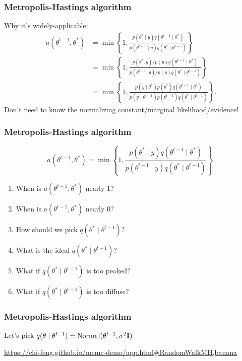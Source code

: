 \documentclass{beamer}
\begin{document}
\begin{frame}
\frametitle{Metropolis-Hastings algorithm}

Why it's widely-applicable:
\begin{align*}
a(\theta^{t-1}, \theta^*) &= \min\left\{1, \frac{p(\theta^* \mid y)q(\theta^{t-1} \mid \theta^*) }{p(\theta^{t-1} \mid y) q(\theta^* \mid \theta^{t-1}) }\right\} \\
&= \min\left\{1, \frac{p(\theta^*, y)/p(y)q(\theta^{t-1} \mid \theta^*) }{p(\theta^{t-1}, y)/p(y) q(\theta^* \mid \theta^{t-1}) }\right\} \\
&= \min\left\{1, \frac{p(y \mid \theta^*) p(\theta^*)q(\theta^{t-1} \mid \theta^*) }{p(y \mid \theta^{t-1}) p(\theta^{t-1}) q(\theta^* \mid \theta^{t-1}) }\right\}.
\end{align*}
Don't need to know the normalizing constant/marginal likelihood/evidence!

\end{frame}
\begin{frame}
\frametitle{Metropolis-Hastings algorithm}

$$
a(\theta^{t-1}, \theta^*) = \min\left\{1, \frac{p(\theta^* \mid y)q(\theta^{t-1} \mid \theta^*) }{p(\theta^{t-1} \mid y) q(\theta^* \mid \theta^{t-1}) }\right\}.
$$

\begin{enumerate}
\item When is $a(\theta^{t-1}, \theta^*)$ nearly $1$?
\item When is $a(\theta^{t-1}, \theta^*)$ nearly $0$?
\item How should we pick $q(\theta^* \mid \theta^{t-1})$?
\item What is the ideal $q(\theta^* \mid \theta^{t-1})$?
\item What if $q(\theta^* \mid \theta^{t-1})$ is too peaked?
\item What if $q(\theta^* \mid \theta^{t-1})$ is too diffuse?
\end{enumerate}


\end{frame}
\begin{frame}
\frametitle{Metropolis-Hastings algorithm}

Let's pick $q(\theta \mid \theta^{t-1}) = \text{Normal}(\theta^{t-1}, \sigma^2 {\bf I} )$
\newline

\url{https://chi-feng.github.io/mcmc-demo/app.html\#RandomWalkMH,banana}
\end{frame}
\end{document}
